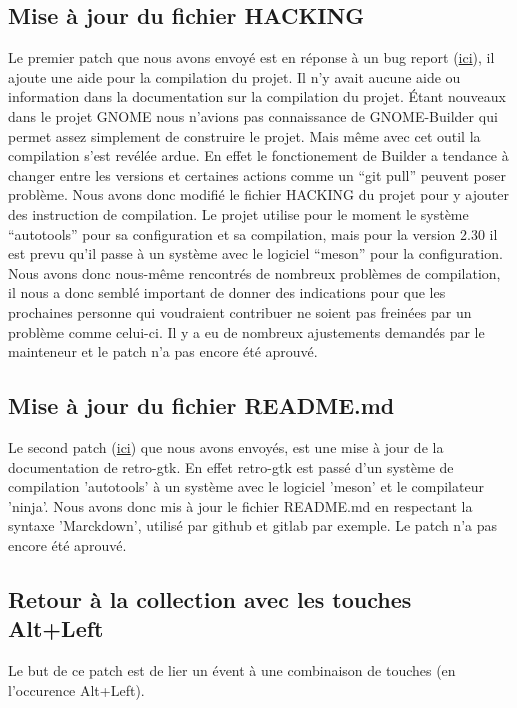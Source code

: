 \documentclass[12pt]{report}
\begin{document}
\subsection{Mise à jour du fichier HACKING}
Le premier patch que nous avons envoyé est en réponse à un bug report
(\href{http://bugzilla.gnome.org/show_bug.cgi?id=788692}{ici}), il ajoute une
aide pour la compilation du projet. \newline
Il n'y avait aucune aide ou information dans la documentation sur la compilation
du projet. Étant nouveaux dans le projet GNOME nous n'avions pas connaissance de 
GNOME-Builder qui permet assez simplement de construire le projet. Mais
même avec cet outil la compilation s'est revélée ardue. En effet 
le fonctionement de Builder a tendance à changer entre les versions et certaines
actions comme un ``git pull'' peuvent poser problème.
Nous avons donc modifié le fichier HACKING du projet pour y ajouter des 
instruction de compilation. \newline
Le projet utilise pour le moment le système ``autotools'' pour sa configuration et 
sa compilation, mais pour la version 2.30 il est prevu qu'il passe à un système
avec le logiciel ``meson'' pour la configuration. \newline
Nous avons donc nous-même rencontrés de nombreux problèmes de compilation,
il nous a donc semblé important de donner des indications pour que les 
prochaines personne qui voudraient contribuer ne soient pas freinées par un 
problème comme celui-ci.
Il y a eu de nombreux ajustements demandés par le mainteneur et le patch n'a 
pas encore été aprouvé. \newline

\subsection{Mise à jour du fichier README.md}
Le second patch (\href{http://bugzilla.gnome.org/show_bug.cgi?id=790454}{ici}) 
que nous avons envoyés, est une mise à jour de la documentation de retro-gtk.
En effet retro-gtk est passé d'un système de compilation 'autotools' à un
système avec le logiciel 'meson' et le compilateur 'ninja'.
Nous avons donc mis à jour le fichier README.md en respectant la syntaxe
'Marckdown', utilisé par github et gitlab par exemple.
Le patch n'a pas encore été aprouvé. \newline

\subsection{Retour à la collection avec les touches Alt+Left}
Le but de ce patch est de lier un évent à une combinaison de touches
(en l'occurence Alt+Left).
\end{document}

